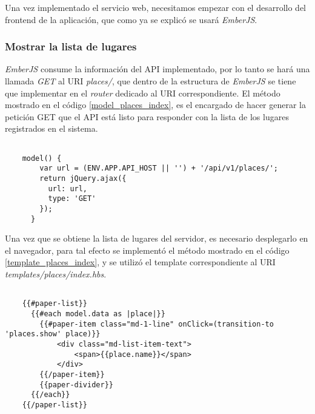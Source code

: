 Una vez implementado el servicio web, necesitamos empezar con el desarrollo del frontend de la aplicación, que como ya se explicó se usará \emph{EmberJS}. \\


\subsubsection{Mostrar la lista de lugares}


\emph{EmberJS} consume la información del API implementado, por lo tanto se hará una llamada \emph{GET} al URI \emph{places/}, que dentro de la estructura de \emph{EmberJS} se tiene que implementar en el \emph{router} dedicado al URI correspondiente. El método mostrado en el código \ref{model_places_index}, es el encargado de hacer generar la petición GET que el API está listo para responder con la lista de los lugares registrados en el sistema. \\

\begin{center}
  \begin{lstlisting}[label=model_places_index,caption=Método para obtener la lista de lugares del API]

    model() {
        var url = (ENV.APP.API_HOST || '') + '/api/v1/places/';
        return jQuery.ajax({
          url: url,
          type: 'GET'
        });
      }

  \end{lstlisting}
\end{center}

Una vez que se obtiene la lista de lugares del servidor, es necesario desplegarlo en el navegador, para tal efecto se implement\'o el método mostrado en el código \ref{template_places_index}, y se utilizó el template correspondiente al URI \emph{templates/places/index.hbs}.

\begin{center}
  \begin{lstlisting}[label=template_places_index,caption=Template de la lista de lugares]

    {{#paper-list}}
      {{#each model.data as |place|}}
        {{#paper-item class="md-1-line" onClick=(transition-to 'places.show' place)}}
            <div class="md-list-item-text">
                <span>{{place.name}}</span>
            </div>
        {{/paper-item}}
        {{paper-divider}}
      {{/each}}
    {{/paper-list}}

  \end{lstlisting}
\end{center}

